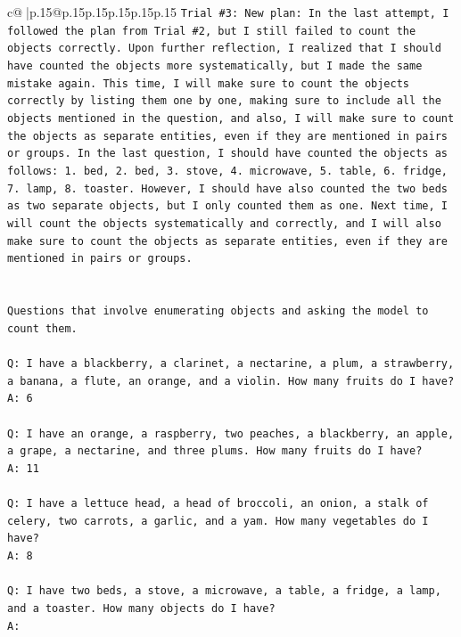 \documentclass{article}
\begin{document}
{\begin{supertabular}{c@{$\;$}|p{.15\linewidth}@{}p{.15\linewidth}p{.15\linewidth}p{.15\linewidth}p{.15\linewidth}p{.15\linewidth}}
{{{\texttt{Trial \#3: New plan: In the last attempt, I followed the plan from Trial \#2, but I still failed to count the objects correctly. Upon further reflection, I realized that I should have counted the objects more systematically, but I made the same mistake again. This time, I will make sure to count the objects correctly by listing them one by one, making sure to include all the objects mentioned in the question, and also, I will make sure to count the objects as separate entities, even if they are mentioned in pairs or groups. In the last question, I should have counted the objects as follows: 1. bed, 2. bed, 3. stove, 4. microwave, 5. table, 6. fridge, 7. lamp, 8. toaster. However, I should have also counted the two beds as two separate objects, but I only counted them as one. Next time, I will count the objects systematically and correctly, and I will also make sure to count the objects as separate entities, even if they are mentioned in pairs or groups.} \\
\\ 
\\ 
\texttt{Questions that involve enumerating objects and asking the model to count them.} \\
\\ 
\texttt{Q: I have a blackberry, a clarinet, a nectarine, a plum, a strawberry, a banana, a flute, an orange, and a violin. How many fruits do I have?} \\
\texttt{A: 6} \\
\\ 
\texttt{Q: I have an orange, a raspberry, two peaches, a blackberry, an apple, a grape, a nectarine, and three plums. How many fruits do I have?} \\
\texttt{A: 11} \\
\\ 
\texttt{Q: I have a lettuce head, a head of broccoli, an onion, a stalk of celery, two carrots, a garlic, and a yam. How many vegetables do I have?} \\
\texttt{A: 8} \\
\\ 
\texttt{Q: I have two beds, a stove, a microwave, a table, a fridge, a lamp, and a toaster. How many objects do I have?} \\
\texttt{A:} \\
            }
        }
    }
     \\ \\


\end{supertabular}}
\end{document}
